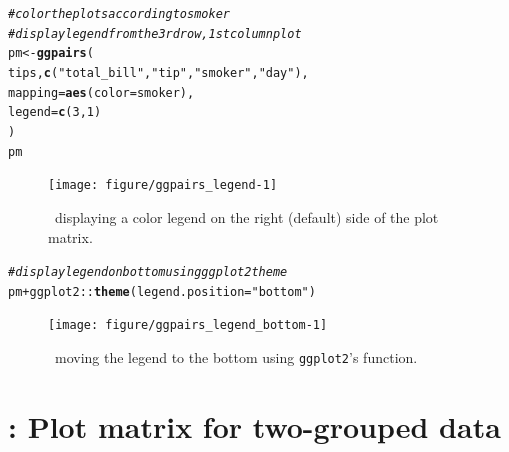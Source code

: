 \documentclass[stat,dissertation]{puthesis}\usepackage[]{graphicx}\usepackage{xcolor}
\makeatletter
\newcommand{\hlnum}[1]{\textcolor[rgb]{0.686,0.059,0.569}{#1}}%
\newcommand{\hlstr}[1]{\textcolor[rgb]{0.192,0.494,0.8}{#1}}%
\newcommand{\hlcom}[1]{\textcolor[rgb]{0.678,0.584,0.686}{\textit{#1}}}%
\newcommand{\hlopt}[1]{\textcolor[rgb]{0,0,0}{#1}}%
\newcommand{\hlstd}[1]{\textcolor[rgb]{0.345,0.345,0.345}{#1}}%
\newcommand{\hlkwb}[1]{\textcolor[rgb]{0.69,0.353,0.396}{#1}}%
\newcommand{\hlkwc}[1]{\textcolor[rgb]{0.333,0.667,0.333}{#1}}%
\newcommand{\hlkwd}[1]{\textcolor[rgb]{0.737,0.353,0.396}{\textbf{#1}}}%
\newenvironment{kframe}{%
 \def\at@end@of@kframe{}%
 \ifinner\ifhmode%
  \def\at@end@of@kframe{\end{minipage}}%
  \begin{minipage}{\columnwidth}%
 \fi\fi%
 \def\FrameCommand##1{\hskip\@totalleftmargin \hskip-\fboxsep
 \colorbox{shadecolor}{##1}\hskip-\fboxsep
     \hskip-\linewidth \hskip-\@totalleftmargin \hskip\columnwidth}%
 \MakeFramed {\advance\hsize-\width
   \@totalleftmargin\z@ \linewidth\hsize
   \@setminipage}}%
 {\par\unskip\endMakeFramed%
 \at@end@of@kframe}
\newenvironment{knitrout}{}{} %
\renewenvironment{knitrout}{\setstretch{1}}{}
\newcommand{\pkg}[1]{\texttt{#1}}
\newcommand{\ggplot}{\pkg{ggplot2}}
\makeatother
\begin{document}
\newpage
\begin{knitrout}\small
{}\color{fgcolor}\begin{kframe}
\begin{alltt}
\hlcom{# color the plots according to smoker}
\hlcom{# display legend from the 3rd row, 1st column plot}
\hlstd{pm} \hlkwb{<-} \hlkwd{ggpairs}\hlstd{(}
  \hlstd{tips,} \hlkwd{c}\hlstd{(}\hlstr{"total_bill"}\hlstd{,} \hlstr{"tip"}\hlstd{,} \hlstr{"smoker"}\hlstd{,} \hlstr{"day"}\hlstd{),}
  \hlkwc{mapping} \hlstd{=} \hlkwd{aes}\hlstd{(}\hlkwc{color} \hlstd{= smoker),}
  \hlkwc{legend} \hlstd{=} \hlkwd{c}\hlstd{(}\hlnum{3}\hlstd{,}\hlnum{1}\hlstd{)}
\hlstd{)}
\hlstd{pm}
\end{alltt}
\end{kframe}\begin{figure}[H]

{\centering \texttt{[image: figure/ggpairs\_legend-1]} 

}

\caption{~displaying a color legend on the right (default) side of the plot matrix.}\label{fig:ggpairs_legend}
\end{figure}


\end{knitrout}
\newpage
\begin{knitrout}\small
{}\color{fgcolor}\begin{kframe}
\begin{alltt}
\hlcom{# display legend on bottom using ggplot2 theme}
\hlstd{pm} \hlopt{+} \hlstd{ggplot2}\hlopt{::}\hlkwd{theme}\hlstd{(}\hlkwc{legend.position} \hlstd{=} \hlstr{"bottom"}\hlstd{)}
\end{alltt}
\end{kframe}\begin{figure}[H]

{\centering \texttt{[image: figure/ggpairs\_legend\_bottom-1]} 

}

\caption{~moving the legend to the bottom using \ggplot's  function.}\label{fig:ggpairs_legend_bottom}
\end{figure}


\end{knitrout}


\section{: Plot matrix for two-grouped data}
\end{document}
